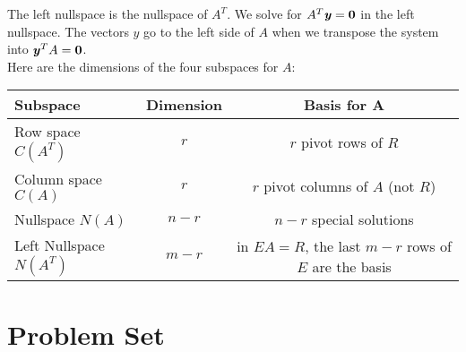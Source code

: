 \documentclass[12pt, letterpaper]{article}
\newcommand{\V}[1]{\textbf{\textit{#1}}}
\theoremstyle{definition}
\begin{document}
	\noindent The left nullspace is the nullspace of $A^T$. We solve for $A^T \V{y} = \textbf{0}$ in the left nullspace. The vectors $y$ go to the left side of $A$ when we transpose the system into $\V{y}^T A = \textbf{0}$. \\
	
	
	\noindent Here are the dimensions of the four subspaces for $A$: 	
		\begin{center}
				\begin{tabular}{ |l|c|c| } 
					\hline
						Subspace & Dimension & Basis for A\\
					\hline
						Row space $C(A^T)$  	& $r$   & $r$ pivot rows of $R$\\ 
						Column space $C(A)$ 	& $r$   & $r$ pivot columns of $A$ (not $R$)\\ 
						Nullspace $N(A)$  		& $n-r$ & $n-r$ special solutions \\
						Left Nullspace $N(A^T)$ & $m-r$ & in $EA = R$, the last $m-r$ rows of $E$ are the basis\\
					\hline
			\end{tabular}
		\end{center}
	
	
	
\section{Problem Set}
	
\end{document}
